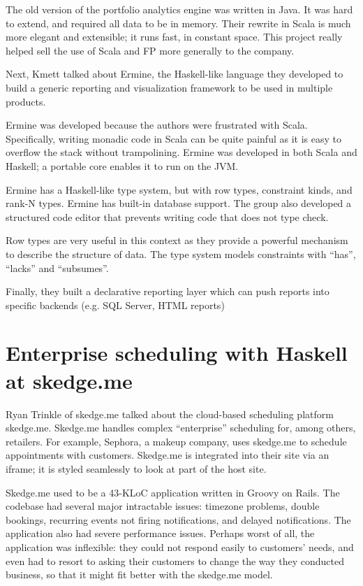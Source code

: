 \documentclass{jfp1}
\begin{document}
The old version of the portfolio analytics engine was written in Java.
It was hard to extend, and required all data to be in memory. Their
rewrite in Scala is much more elegant and extensible; it runs fast, in
constant space. This project really helped sell the use of Scala and
FP more generally to the company.

Next, Kmett talked about Ermine, the Haskell-like language they
developed to build a generic reporting and visualization framework to
be used in multiple products.

Ermine was developed because the authors were frustrated with Scala.
Specifically, writing monadic code in Scala can be quite painful as it
is easy to overflow the stack without trampolining. Ermine was developed
in both Scala and Haskell; a portable core enables it to run on the
JVM.

Ermine has a Haskell-like type system, but with row types, constraint
kinds, and rank-N types. Ermine has built-in database support. The
group also developed a structured code editor that prevents writing
code that does not type check.

Row types are very useful in this context as they provide a powerful mechanism
to describe the structure of data. The type system models constraints
with ``has'', ``lacks'' and ``subsumes''.

Finally, they built a declarative reporting layer which can push reports
into specific backends (e.g. SQL Server, HTML reports)

\section{Enterprise scheduling with Haskell at skedge.me}


Ryan Trinkle of skedge.me talked about the cloud-based scheduling
platform skedge.me. Skedge.me handles complex ``enterprise''
scheduling for, among others, retailers. For example, Sephora, a
makeup company, uses skedge.me to schedule appointments with
customers. Skedge.me is integrated into their site via an iframe; it
is styled seamlessly to look at part of the host site.

Skedge.me used to be a 43-KLoC application written in Groovy on Rails.
The codebase had several major intractable issues: timezone problems,
double bookings, recurring events not firing notifications, and
delayed notifications. The application also had severe performance
issues. Perhaps worst of all, the application was inflexible: they
could not respond easily to customers' needs, and even had to resort to
asking their customers to change the way they conducted business, so
that it might fit better with the skedge.me model.
\end{document}

